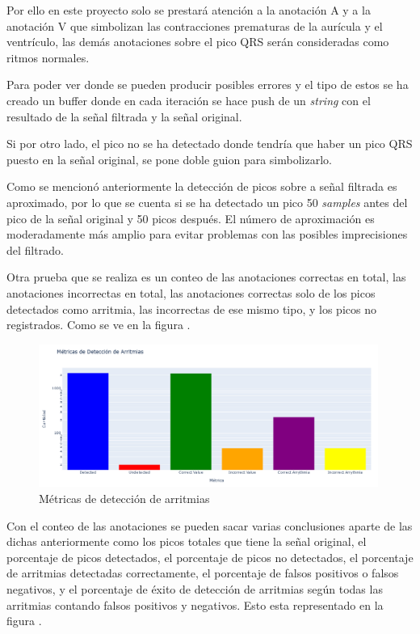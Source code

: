 Por ello en este proyecto solo se prestará atención a la anotación A y a la anotación V que simbolizan 
las contracciones prematuras de la aurícula y el ventrículo, las demás anotaciones sobre el pico QRS serán 
consideradas como ritmos normales.

Para poder ver donde se pueden producir posibles errores y el tipo de estos se ha creado un buffer donde en 
cada iteración se hace push de un \textit{string} con el resultado de la señal filtrada y la señal original.

Si por otro lado, el pico no se ha detectado donde tendría que haber un pico QRS puesto en la señal original, 
se pone doble guion para simbolizarlo.

Como se mencionó anteriormente la detección de picos sobre a señal filtrada es aproximado, por lo que se cuenta
si se ha detectado un pico 50 \textit{samples} antes del pico de la señal original y 50 picos después. El número de aproximación 
es moderadamente más amplio para evitar problemas con las posibles imprecisiones del filtrado.  

Otra prueba que se realiza es un conteo de las anotaciones correctas en total, las anotaciones incorrectas en total, las anotaciones
correctas solo de los picos detectados como arritmia, las incorrectas de ese mismo tipo, y los picos no registrados. 
Como se ve en la figura .

\begin{figure}[h!]
	\centering
    \includegraphics[width=0.99\textwidth]{./Images/img_algoritmo/estadisticas_arritmias_1.png}
    \caption{Métricas de detección de arritmias}
    \label{fig:estadisticas_algoritmos_1}
\end{figure} 

Con el conteo de las anotaciones se pueden sacar varias conclusiones aparte de las dichas 
anteriormente como los picos totales que tiene la señal original, el porcentaje de picos 
detectados, el porcentaje de picos no detectados, el porcentaje de arritmias detectadas 
correctamente, el porcentaje de falsos positivos o falsos negativos, y el porcentaje de éxito de detección de 
arritmias según todas las arritmias contando falsos positivos y negativos. Esto esta representado en la figura .

